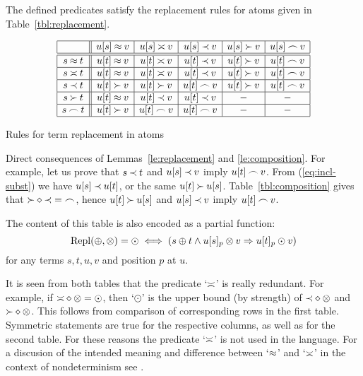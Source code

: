 \begin{LEMMA} \label{le:replacement-in-atoms}
The defined predicates satisfy the replacement rules for atoms given in
Table~\ref {tbl:replacement}.
\begin{table}[hbt]
\[\begin{array}{|c||c|c|c|c|c|}
\hline
          & u[s]\mathbin{\approx} v   & u[s]\mathbin{\asymp} v & u[s]\mathbin{\prec} v & u[s]\mathbin{\succ} v & u[s]\mathbin{\frown} v\\
\hline
\hline
s\mathbin{\approx} t    & u[t]\mathbin{\approx} v   & u[t]\mathbin{\asymp} v & u[t]\mathbin{\prec} v & u[t]\mathbin{\succ} v & u[t]\mathbin{\frown} v \\
\hline
s\mathbin{\asymp} t & u[t]\mathbin{\approx} v   & u[t]\mathbin{\asymp} v & u[t]\mathbin{\prec} v & u[t]\mathbin{\succ} v & u[t]\mathbin{\frown} v\\
\hline
s\mathbin{\prec} t  & u[t]\mathbin{\succ} v & u[t]\mathbin{\succ}  v & u[t]\mathbin{\frown} v  & u[t]\mathbin{\succ} v & u[t]\mathbin{\frown} v \\
\hline
s\mathbin{\succ} t  & u[t]\mathbin{\approx} v   & u[t]\mathbin{\prec} v  & u[t]\mathbin{\prec} v & -           &  -   \\
\hline
s\mathbin{\frown} t   & u[t]\mathbin{\succ} v & u[t]\mathbin{\frown}  v  & u[t]\mathbin{\frown} v  & -           & -    \\
\hline 
\end{array}\]
\caption{Rules for term replacement in atoms} \label{tbl:replacement}
\end{table}
\end{LEMMA}
\begin{PROOF}
Direct consequences of Lemmas~\ref{le:replacement} and \ref{le:composition}.
For example, let us prove that 
\(s\mathbin{\prec} t\) and \(u[s]\mathbin{\prec} v\) imply \( u[t]\mathbin{\frown}
v\). From (\ref{eq:incl-subst}) we have \(u[s]\mathbin{\prec} u[t]\), or the same
\(u[t]\mathbin{\succ} u[s]\). Table~\ref {tbl:composition} gives that \(\mathbin{\succ}\diamond\mathbin{\prec} =\mathbin{\frown}\), hence \(u[t]\mathbin{\succ} u[s]\) and \(u[s]\mathbin{\prec} v\) imply \( u[t]\mathbin{\frown}
v\). 
\end{PROOF}

The content of this table is also encoded as a partial function:
\[\mbox{\rm Repl}(\oplus,\otimes)=\odot\iff(s\oplus t\land u[s]_p\otimes v\mathrel\Rightarrow u[t]_p\odot v)\] 
for any terms $s,t,u,v$ and position $p$ at $u$.

It is seen from both tables that the predicate `$\mathbin{\asymp}$' is really redundant.
For example, if \(\mathbin{\asymp}\diamond\otimes=\odot\), then `$\odot$' is the
upper bound (by strength) of \(\mathbin{\prec}\diamond\otimes\) and \(\mathbin{\succ}\diamond\otimes\).
This follows from comparison of corresponding rows in the first table. 
Symmetric statements are true for the respective columns, as well as for the 
second table. For
these reasons the predicate `$\mathbin{\asymp}$' is not used in the language. For a
discusion of the intended meaning and difference 
between `$\mathbin{\approx}$' and `$\mathbin{\asymp}$' in the context of nondeterminism 
see \cite{MW,Mich}. 

